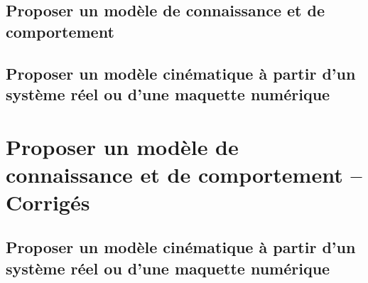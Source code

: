 \documentclass[10pt,fleqn]{article} %
\newcommand{\td}{fichier_td}
\newcommand{\repExo}{dossier}
\newcommand{\repStyle}{../../Style}
\begin{document}
\def\xxcompetences{}
\def\xxfigures{}

\graphicspath{{\repStyle/png/}}





\setlength{\columnseprule}{.1pt}


\pagestyle{fancy}
\thispagestyle{plain}





\proffalse
\begin{multicols}{2}
\section{Proposer un modèle de connaissance et de comportement}
\subsection{Proposer un modèle cinématique à partir d'un système réel ou d'une maquette numérique}


\renewcommand{\repExo}{../../ExercicesCompetences/B2_ProposerModele/B2_12_ModeliserSchemaCinematiques}
\renewcommand{\td}{01_R}
\graphicspath{{\repStyle/png/}{\repExo/\td/images/}}



\renewcommand{\repExo}{../../ExercicesCompetences/B2_ProposerModele/B2_12_ModeliserSchemaCinematiques}
\renewcommand{\td}{02_T}
\graphicspath{{\repStyle/png/}{\repExo/\td/images/}}



\end{multicols}
\newpage

\section{Proposer un modèle de connaissance et de comportement -- Corrigés}
\subsection{Proposer un modèle cinématique à partir d'un système réel ou d'une maquette numérique}
\proftrue

\renewcommand{\repExo}{../../ExercicesCompetences/B2_ProposerModele/B2_12_ModeliserSchemaCinematiques}
\renewcommand{\td}{01_R}
\graphicspath{{\repStyle/png/}{\repExo/\td/images/}}



\renewcommand{\repExo}{../../ExercicesCompetences/B2_ProposerModele/B2_12_ModeliserSchemaCinematiques}
\renewcommand{\td}{02_T}
\graphicspath{{\repStyle/png/}{\repExo/\td/images/}}

\end{document}
